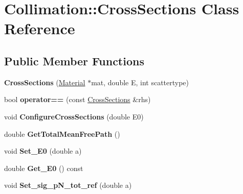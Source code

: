 \hypertarget{classCollimation_1_1CrossSections}{}\section{Collimation\+:\+:Cross\+Sections Class Reference}
\label{classCollimation_1_1CrossSections}
\subsection*{Public Member Functions}
\begin{DoxyCompactItemize}
\item 
\mbox{\label{classCollimation_1_1CrossSections_af198fdf0a641898485ed0e28e1044ee3}} 
{\bfseries Cross\+Sections} (\hyperlink{classMaterial}{Material} $\ast$mat, double E, int scattertype)
\item 
\mbox{\label{classCollimation_1_1CrossSections_ae08c93cdc037cd9e36cd53ee158b9cc3}} 
bool {\bfseries operator==} (const \hyperlink{classCollimation_1_1CrossSections}{Cross\+Sections} \&rhs)
\item 
\mbox{\label{classCollimation_1_1CrossSections_ad5c87b9d0d93ee57e7d01b80ee4b5708}} 
void {\bfseries Configure\+Cross\+Sections} (double E0)
\item 
\mbox{\label{classCollimation_1_1CrossSections_a7e7758d0981c978be882530ff75205a3}} 
double {\bfseries Get\+Total\+Mean\+Free\+Path} ()
\item 
\mbox{\label{classCollimation_1_1CrossSections_a004c8d8142324cd8b079b8e8d83efdf6}} 
void {\bfseries Set\+\_\+\+E0} (double a)
\item 
\mbox{\label{classCollimation_1_1CrossSections_a90165895d41755e3084a4208025729bf}} 
double {\bfseries Get\+\_\+\+E0} () const
\item 
\mbox{\label{classCollimation_1_1CrossSections_ad3a26cb9585681523d27c32f69ad76e0}} 
void {\bfseries Set\+\_\+sig\+\_\+p\+N\+\_\+tot\+\_\+ref} (double a)

\end{DoxyCompactItemize}

